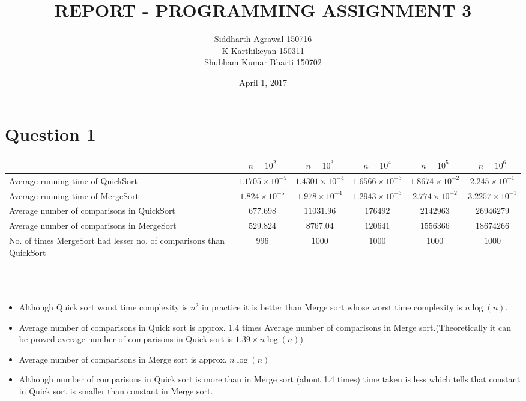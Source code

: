 \documentclass[a4paper,10pt]{article}
\title{\textbf{REPORT - PROGRAMMING ASSIGNMENT 3}}
\author{Siddharth Agrawal 150716\\K Karthikeyan 150311\\Shubham Kumar Bharti 150702}
\date{April 1, 2017}
\begin{document}
\maketitle

\section*{Question 1}

\begin{tabular}{|L{5cm}|c|c|c|c|c|}

\hline
 & $n=10^2$ & $n=10^3$ & $n=10^4$ & $n=10^5$ & $n=10^6$\\
\hline
\hline
 Average running time of QuickSort & $1.1705\times10^{-5}$ & $1.4301\times10^{-4}$ & $1.6566\times10^{-3}$ & $1.8674\times10^{-2}$ & $2.245 \times 10^{-1}$ \\
\hline
 Average running time of MergeSort & $1.824\times10^{-5}$ & $1.978\times10^{-4}$ & $1.2943\times10^{-3}$ & $2.774\times10^{-2}$ & $3.2257\times10^{-1}$ \\
\hline
 Average number of comparisons in QuickSort & $677.698$ & $11031.96$ & $176492$ & $2142963$ & $26946279$ \\
\hline
 Average number of comparisons in MergeSort & $529.824$ & $8767.04$ & $120641$ & $1556366$ & $18674266$ \\
\hline
 No. of times MergeSort had lesser no. of comparisons than QuickSort & $996$ & $1000$ & $1000$ & $1000$ & $1000$\\
\hline
 
\end{tabular}
\\
\\
\begin{itemize}
  \item Although Quick sort worst time complexity is $ n^2$ in practice it is better than Merge sort whose worst time complexity is $n \log(n) $.
  \item Average number of comparisons in Quick sort is approx. 1.4 times Average number of comparisons in Merge sort.(Theoretically it can be proved average number of comparisons in Quick sort is $ 1.39 \times n \log(n)$)
  \item Average number of comparisons in Merge sort is approx. $n \log(n) $ 
  \item Although number of comparisons in Quick sort is more than in Merge sort (about 1.4 times) time taken is less which tells that constant in Quick sort is smaller than constant in Merge sort.
\end{itemize}
\end{document}
